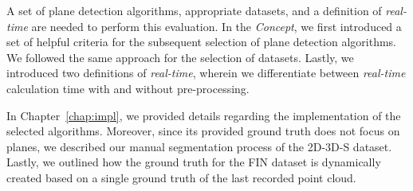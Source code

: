 \documentclass[main.tex]{subfiles}
\begin{document}

A set of plane detection algorithms, appropriate datasets, and a definition of \textit{real-time} are needed to perform this evaluation. In the \textit{Concept}, we first introduced a set of helpful criteria for the subsequent selection of plane detection algorithms. We followed the same approach for the selection of datasets. Lastly, we introduced two definitions of \textit{real-time}, wherein we differentiate between \textit{real-time} calculation time with and without pre-processing.

In Chapter~\ref{chap:impl}, we provided details regarding the implementation of the selected algorithms. Moreover, since its provided ground truth does not focus on planes, we described our manual segmentation process of the 2D-3D-S dataset. Lastly, we outlined how the ground truth for the FIN dataset is dynamically created based on a single ground truth of the last recorded point cloud.
\end{document}
